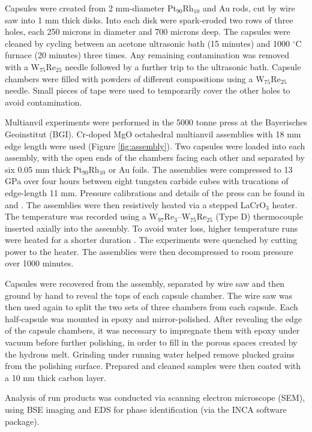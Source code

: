 \documentclass[review]{elsarticle}
\begin{document}
Capsules were created from 2 mm-diameter Pt$_{90}$Rh$_{10}$ and Au rods, cut by wire saw into 1 mm thick disks. Into each disk were spark-eroded two rows of three holes, each 250 microns in diameter and 700 microns deep. The capsules were cleaned by cycling between an acetone ultrasonic bath (15 minutes) and 1000 $^{\circ}$C furnace (20 minutes) three times. Any remaining contamination was removed with a W$_{75}$Re$_{25}$ needle followed by a further trip to the ultrasonic bath. Capsule chambers were filled with powders of different compositions using a W$_{75}$Re$_{25}$ needle. Small pieces of tape were used to temporarily cover the other holes to avoid contamination. 

Multianvil experiments were performed in the 5000 tonne press at the Bayerisches Geoinstitut (BGI). Cr-doped MgO octahedral multianvil assemblies with 18 mm edge length were used (Figure \ref{fig:assembly}). Two capsules were loaded into each assembly, with the open ends of the chambers facing each other and separated by six 0.05 mm thick Pt$_{90}$Rh$_{10}$ or Au foils. The assemblies were compressed to 13 GPa over four hours between eight tungsten carbide cubes with trucations of edge-length 11 mm. Pressure calibrations and details of the press can be found in \cite{FPTLDR2004} and \cite{KF2005}. The assemblies were then resistively heated via a stepped LaCrO$_3$ heater. The temperature was recorded using a W$_{97}$Re$_{3}$--W$_{75}$Re$_{25}$ (Type D) thermocouple inserted axially into the assembly. To avoid water loss, higher temperature runs were heated for a shorter duration \citep[see][]{NDMPMF2016}. The experiments were quenched by cutting power to the heater. The assemblies were then decompressed to room pressure over 1000 minutes. 

Capsules were recovered from the assembly, separated by wire saw and then ground by hand to reveal the tops of each capsule chamber. The wire saw was then used again to split the two sets of three chambers from each capsule. Each half-capsule was mounted in epoxy and mirror-polished. After revealing the edge of the capsule chambers, it was necessary to impregnate them with epoxy under vacuum before further polishing, in order to fill in the porous spaces created by the hydrous melt. Grinding under running water helped remove plucked grains from the polishing surface. Prepared and cleaned samples were then coated with a 10 nm thick carbon layer.

Analysis of run products was conducted via scanning electron microscope (SEM), using BSE imaging and EDS for phase identification (via the INCA software package). 
\end{document}
